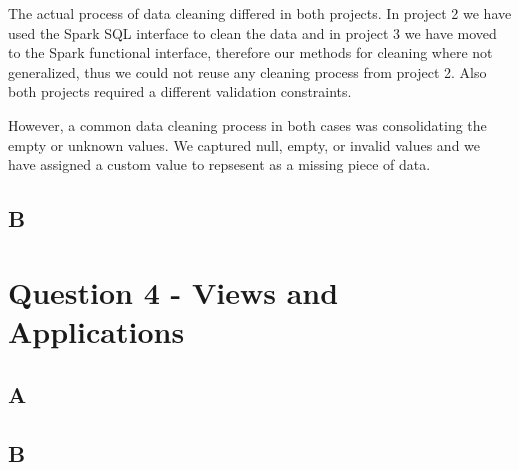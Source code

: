 \documentclass[format=acmsmall, review=false, screen=true]{acmart}
\begin{document}
The actual process of data cleaning differed in both projects. In project 2 we have used the Spark SQL interface to clean the data and in project 3 we have moved to the Spark functional interface, therefore our methods for cleaning where not generalized, thus we could not reuse any cleaning process from project 2. Also both projects required a different validation constraints.

However, a common data cleaning process in both cases was consolidating the empty or unknown values. We captured null, empty, or invalid values and we have assigned a custom value to repsesent as a missing piece of data.


\subsection{B}


\section{Question 4 - Views and Applications }

\subsection{A}

\subsection{B}
\end{document}
